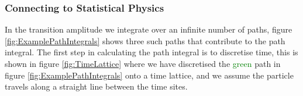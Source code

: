 \documentclass[12pt]{article}
\begin{document}
        \subsubsection{Connecting to Statistical Physics}
        In the transition amplitude we integrate over an infinite number of paths, figure \ref{fig:ExamplePathIntegrals} shows three such paths that contribute to the path integral. The first step in calculating the path integral is to discretise time, this is shown in figure \ref{fig:TimeLattice} where we have discretised the \textcolor{green}{green} path in figure \ref{fig:ExamplePathIntegrals} onto a time lattice, and we assume the particle travels along a straight line between the time sites.
        \begin{figure}
            \centering
            \begin{tikzpicture}[scale=0.5, every node/.style={transform shape}]
                

\end{tikzpicture}
\end{figure}
\end{document}
